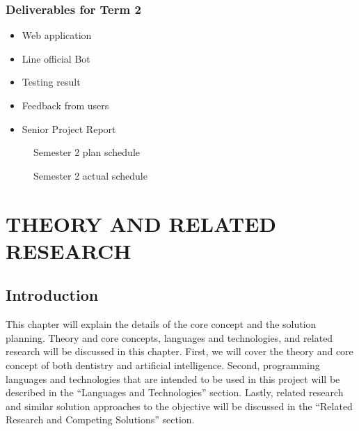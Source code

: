\documentclass[12pt,oneside,openright,a4paper]{cpe-english-project}
\begin{document}
    \subsection*{Deliverables for Term 2}
      \begin{itemize}
        \item Web application
        \item Line official Bot
        \item Testing result
        \item Feedback from users
        \item Senior Project Report
      \end{itemize}
      \newpage
      \begin{figure}[!h]
        \centering
        \caption{Semester 2 plan schedule}\label{fig:Term2_Gantt}
      \end{figure}
      \begin{figure}[!h]
        \centering
        \caption{Semester 2 actual schedule}\label{fig:Term2_Gantt_Actual}
      \end{figure}

\chapter{THEORY AND RELATED RESEARCH}
  \section{Introduction}
    \qquad This chapter will explain the details of the core concept and the solution planning. Theory and core concepts, languages and technologies, and related research will be discussed in this chapter. First, we will cover the theory and core concept of both dentistry and artificial intelligence. Second, programming languages and technologies that are intended to be used in this project will be described in the “Languages and Technologies” section. Lastly, related research and similar solution approaches to the objective will be discussed in the “Related Research and Competing Solutions” section.
    
\end{document}
